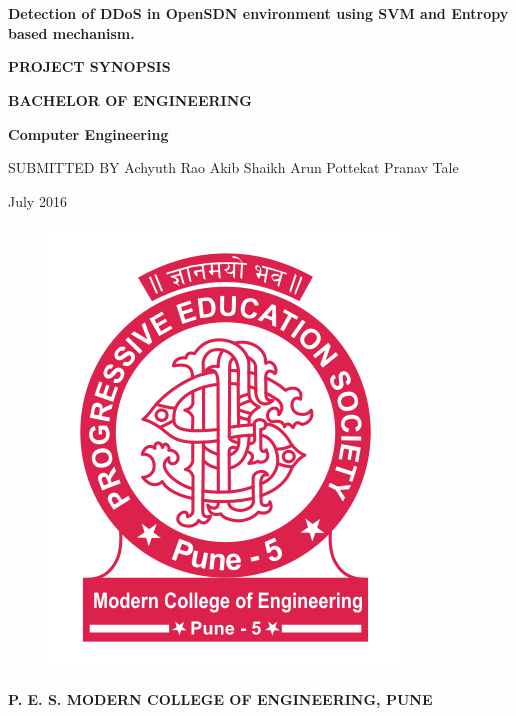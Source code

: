 \documentclass[12pt,a4paper,final]{article}
\begin{document}
\section*{}
\begin{center}
\Huge
\textbf{
Detection of DDoS in OpenSDN environment using SVM and Entropy based mechanism.
}

\vspace*{1.5cm}

\large
\textbf{
PROJECT SYNOPSIS
}

\vspace*{1.5cm}
\textbf{
BACHELOR OF ENGINEERING
}

\Large
\textbf{
Computer Engineering
}

\vspace*{1cm}
\large
SUBMITTED BY
\vspace*{1cm}
\linebreak
Achyuth Rao
\linebreak
Akib Shaikh
\linebreak
Arun Pottekat
\linebreak
Pranav Tale
\linebreak

July 2016

\begin{figure}[h]
\begin{center}
\includegraphics[scale=0.25]{logo.png}
\end{center}
\end{figure}

\Large
\textbf{
P. E. S. MODERN COLLEGE OF ENGINEERING,
\linebreak
PUNE
}
\end{center}
\newpage
\end{document}
